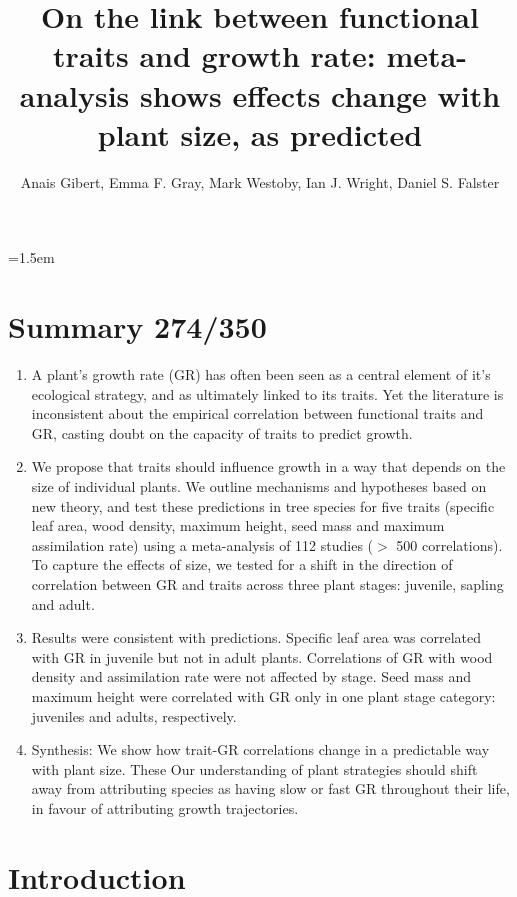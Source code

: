\documentclass[a4paper,11pt]{article}
\title{On the link between functional traits and growth rate: meta-analysis shows effects change with plant size, as predicted}
\author{Anais Gibert\textasteriskcentered, Emma F. Gray, Mark Westoby, Ian J. Wright, Daniel S. Falster}
\affiliation{Biological Sciences, Macquarie University NSW 2109, Australia\\
\textasteriskcentered Email for correspondence: \texttt{anais.gibert@gmail.com}\\
Word count: ~XXXX words}
\date{}
\begin{document}
\mstitlepage
\noindent
\parindent=1.5em
\addtolength{\parskip}{.3em}
\doublespacing
\linenumbers
\section{Summary 274/350}\label{abstract}
\begin{enumerate}
\def\labelenumi{\arabic{enumi}.}
\itemsep1pt\parskip0pt
\item A plant's growth rate (GR) has often been seen as a central element of it's ecological strategy, and as ultimately linked to its traits. Yet the literature is inconsistent about the empirical correlation between functional traits and GR, casting doubt on the capacity of traits to predict growth.

\item We propose that traits should influence growth in a way that depends on the size of individual plants. We outline mechanisms and hypotheses based on new theory, and test these predictions in tree species for five traits (specific leaf area, wood density, maximum height, seed mass and maximum assimilation rate) using a meta-analysis of 112 studies ($>$ 500 correlations). To capture the effects of size, we tested for a shift in the direction of correlation between GR and traits across three plant stages: juvenile, sapling and adult.

\item Results were consistent with predictions. Specific leaf area was correlated with GR in juvenile but not in adult plants. Correlations of GR with wood density and assimilation rate were not affected by stage. Seed mass and maximum height were correlated with GR only in one plant stage category: juveniles and adults, respectively.

\item Synthesis: We show how trait-GR correlations change in a predictable way with plant size. These  Our understanding of plant strategies should shift away from attributing species as having slow or fast GR throughout their life, in favour of attributing growth trajectories.

\end{enumerate}

\clearpage

\section*{Introduction}\label{introduction}
\end{document}
